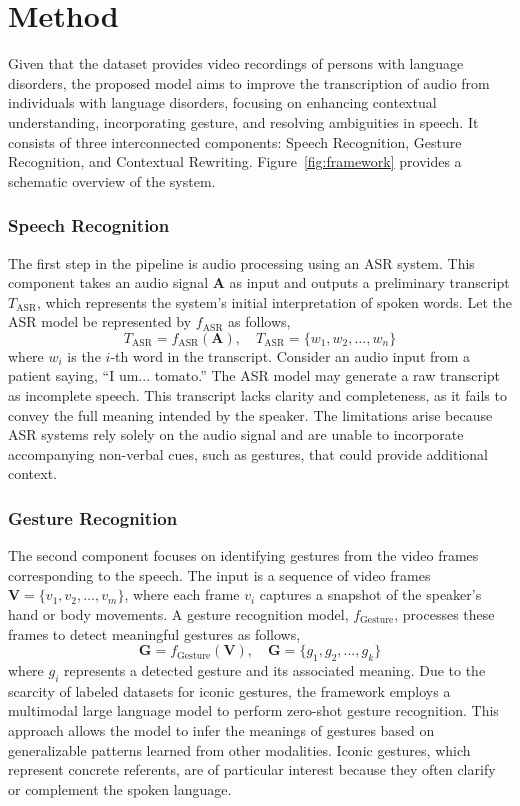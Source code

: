 


\section{Method}
Given that the dataset provides video recordings of persons with language disorders, the proposed model aims to improve the transcription of audio from individuals with language disorders, focusing on enhancing contextual understanding, incorporating gesture, and resolving ambiguities in speech. It consists of three interconnected components: Speech Recognition, Gesture Recognition, and Contextual Rewriting. Figure~\ref{fig:framework} provides a schematic overview of the system. 

\subsubsection{Speech Recognition}
The first step in the pipeline is audio processing using an ASR system. This component takes an audio signal $\mathbf{A}$ as input and outputs a preliminary transcript $T_{\text{ASR}}$, which represents the system’s initial interpretation of spoken words. Let the ASR model be represented by $f_{\text{ASR}}$ as follows,
\begin{equation}
T_{\text{ASR}} = f_{\text{ASR}}(\mathbf{A}), \quad T_{\text{ASR}} = \{ w_1, w_2, \ldots, w_n \}
\end{equation}
where $w_i$ is the $i$-th word in the transcript.
Consider an audio input from a patient saying, ``I um... tomato.'' The ASR model may generate a raw transcript as incomplete speech. This transcript lacks clarity and completeness, as it fails to convey the full meaning intended by the speaker. The limitations arise because ASR systems rely solely on the audio signal and are unable to incorporate accompanying non-verbal cues, such as gestures, that could provide additional context.

\subsubsection{Gesture Recognition}   
The second component focuses on identifying gestures from the video frames corresponding to the speech. The input is a sequence of video frames $\mathbf{V} = \{ v_1, v_2, \ldots, v_m \}$, where each frame $v_i$ captures a snapshot of the speaker's hand or body movements. A gesture recognition model, $f_{\text{Gesture}}$, processes these frames to detect meaningful gestures as follows,
\begin{equation}
\mathbf{G} = f_{\text{Gesture}}(\mathbf{V}), \quad \mathbf{G} = \{ g_1, g_2, \ldots, g_k \}
\end{equation}
where $g_i$ represents a detected gesture and its associated meaning. Due to the scarcity of labeled datasets for iconic gestures, the framework employs a multimodal large language model to perform zero-shot gesture recognition. This approach allows the model to infer the meanings of gestures based on generalizable patterns learned from other modalities. Iconic gestures, which represent concrete referents, are of particular interest because they often clarify or complement the spoken language.

